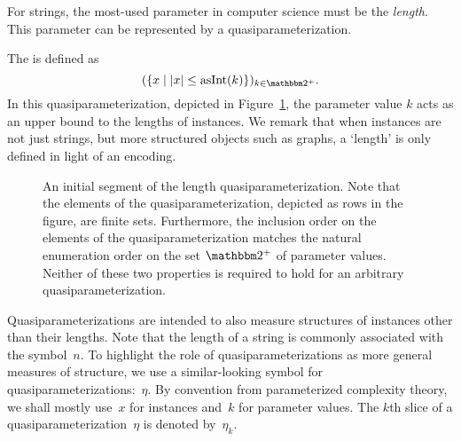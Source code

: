 For strings, the most-used parameter in computer science must be the \emph{length}.
This parameter can be represented by a quasiparameterization.
\begin{example}
\label{ex:length_parameterization}%
  The  \parencite[see also][Example~1.6]{flum2006parameterized} is defined as
  \begin{equation*}
    (\{x \st \length{x} \le \asNat(k)\})_{k \in \binary^+}.
  \end{equation*}
  In this quasiparameterization, depicted in Figure~\ref{fig:length_parameterization}, the parameter value $k$ acts as an upper bound to the lengths of instances.
  We remark that when instances are not just strings, but more structured objects such as graphs, a `length' is only defined in light of an encoding.
  \begin{figure}
    \centering
    \caption{
      An initial segment of the length quasiparameterization.
      Note that the elements of the quasiparameterization, depicted as rows in the figure, are finite sets.
      Furthermore, the inclusion order on the elements of the quasiparameterization matches the natural enumeration order on the set $\binary^+$ of parameter values.
      Neither of these two properties is required to hold for an arbitrary quasiparameterization.
    }
    \label{fig:length_parameterization}
  \end{figure}
\end{example}

Quasiparameterizations are intended to also measure structures of instances other than their lengths.
Note that the length of a string is commonly associated with the symbol~$n$.
To highlight the role of quasiparameterizations as more general measures of structure, we use a similar-looking symbol for quasiparameterizations:~$\eta$.
By convention from parameterized complexity theory, we shall mostly use~$x$ for instances and~$k$ for parameter values.
The $k$th slice of a quasiparameterization~$\eta$ is denoted by~$\eta_k$.

